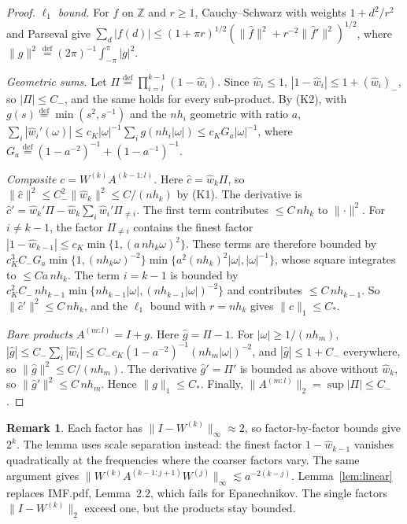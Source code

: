 \documentclass[11pt]{article}
\newcommand{\Z}{\mathbb{Z}}
\newcommand{\defeq}{\stackrel{\mathrm{def}}{=}}
\newcommand{\norm}[1]{\lVert#1\rVert}
\theoremstyle{definition}
\newtheorem*{remark}{Remark}
\begin{document}
\begin{proof}
\emph{\(\ell_1\) bound.}  For \(f\) on \(\Z\) and \(r\ge1\), Cauchy--Schwarz
with weights \(1+d^2/r^2\) and Parseval give
\(\sum_d|f(d)|\le(1+\pi r)^{1/2}(\norm{\hat f}^2+r^{-2}\norm{\hat f'}^2)^{1/2}\),
where \(\norm g^2\defeq(2\pi)^{-1}\int_{-\pi}^{\pi}|g|^2\).

\emph{Geometric sums.}  Let \(\Pi\defeq\prod_{i=l}^{k-1}(1-\hat w_i)\).  Since
\(\hat w_i\le1\), \(|1-\hat w_i|\le1+(\hat w_i)_-\), so \(|\Pi|\le C_-\), and
the same holds for every sub-product.  By (K2), with
\(g(s)\defeq\min(s^2,s^{-1})\) and the \(nh_i\) geometric with ratio \(a\),
\(\sum_i|\hat w_i'(\omega)|\le c_K|\omega|^{-1}\sum_ig(nh_i|\omega|)\le c_KG_a|\omega|^{-1}\),
where \(G_a\defeq(1-a^{-2})^{-1}+(1-a^{-1})^{-1}\).

\emph{Composite \(c=W^{(k)}A^{(k-1:l)}\).}  Here \(\hat c=\hat w_k\Pi\), so
\(\norm{\hat c}^2\le C_-^2\norm{\hat w_k}^2\le C/(nh_k)\) by (K1).  The
derivative is \(\hat c'=\hat w_k'\Pi-\hat w_k\sum_i\hat w_i'\Pi_{\ne i}\).
The first term contributes \(\le C\,nh_k\) to \(\norm\cdot^2\).  For
\(i\ne k-1\), the factor \(\Pi_{\ne i}\) contains the finest factor
\(|1-\hat w_{k-1}|\le c_K\min\{1,(a\,nh_k\omega)^2\}\).  These terms are
therefore bounded by
\(c_K^3C_-G_a\min\{1,(nh_k\omega)^{-2}\}\min\{a^2(nh_k)^2|\omega|,|\omega|^{-1}\}\),
whose square integrates to \(\le Ca\,nh_k\).  The term \(i=k-1\) is bounded
by \(c_K^2C_-\,nh_{k-1}\min\{nh_{k-1}|\omega|,(nh_{k-1}|\omega|)^{-2}\}\) and
contributes \(\le C\,nh_{k-1}\).  So \(\norm{\hat c'}^2\le C\,nh_k\), and the
\(\ell_1\) bound with \(r=nh_k\) gives \(\norm c_1\le C_*\).

\emph{Bare products \(A^{(m:l)}=I+g\).}  Here \(\hat g=\Pi-1\).  For
\(|\omega|\ge1/(nh_m)\),
\(|\hat g|\le C_-\sum_i|\hat w_i|\le C_-c_K(1-a^{-2})^{-1}(nh_m|\omega|)^{-2}\),
and \(|\hat g|\le1+C_-\) everywhere, so \(\norm{\hat g}^2\le C/(nh_m)\).
The derivative \(\hat g'=\Pi'\) is bounded as above without \(\hat w_k\), so
\(\norm{\hat g'}^2\le C\,nh_m\).  Hence \(\norm g_1\le C_*\).  Finally,
\(\norm{A^{(m:l)}}_2=\sup|\Pi|\le C_-\).
\end{proof}

\begin{remark}
Each factor has \(\norm{I-W^{(k)}}_\infty\approx2\), so factor-by-factor
bounds give \(2^k\).  The lemma uses scale separation instead: the finest
factor \(1-\hat w_{k-1}\) vanishes quadratically at the frequencies where
the coarser factors vary.  The same argument gives
\(\norm{W^{(k)}A^{(k-1:j+1)}W^{(j)}}_\infty\lesssim a^{-2(k-j)}\).
Lemma~\ref{lem:linear} replaces IMF.pdf, Lemma~2.2, which fails for
Epanechnikov.  The single factors \(\norm{I-W^{(k)}}_2\) exceed one, but
the products stay bounded.
\end{remark}
\end{document}
